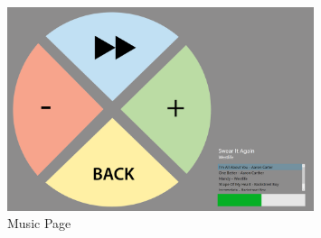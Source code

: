 \begin{figure}[ht]
	\centering
	\includegraphics[width=0.8\textwidth]{chapter6/pagemusic.png}
	\caption{Music Page}
\end{figure}

